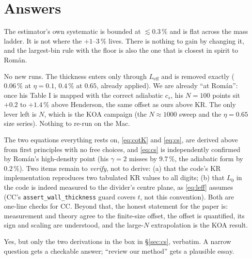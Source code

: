 \documentclass[11pt,a4paper]{article}
\newcommand{\Leff}{L_{\mathrm{eff}}}
\begin{document}
\section{Answers}
\label{sec:answers}
\begin{answer}
The estimator's own systematic is bounded at $\lesssim 0.3\,\%$ and is flat across the mass ladder. It is not where the $+1$--$3\,\%$ lives. There is nothing to gain by changing it, and the largest-bin rule with the floor is also the one that is closest in spirit to Rom\'an.
\end{answer}
\begin{answer}
No new runs. The thickness enters only through $\Leff$ and is removed exactly ($0.06\,\%$ at $\eta=0.1$, $0.4\,\%$ at $0.65$, already applied). We are already ``at Rom\'an'': once his Table I is mapped with the correct adiabatic $c_s$, his $N=100$ points sit $+0.2$ to $+1.4\,\%$ above Henderson, the same offset as ours above KR. The only lever left is $N$, which is the KOA campaign (the $N\approx1000$ sweep and the $\eta=0.65$ size series). Nothing to re-run on the Mac.
\end{answer}
\begin{answer}
The two equations everything rests on, \eqref{eq:cotK} and \eqref{eq:cs}, are derived above from first principles with no free choices, and \eqref{eq:cs} is independently confirmed by Rom\'an's high-density point (his $\gamma=2$ misses by $9.7\,\%$, the adiabatic form by $0.2\,\%$). Two items remain to \emph{verify}, not to derive: (a) that the code's KR implementation reproduces two tabulated KR values to all digits; (b) that $L_0$ in the code is indeed measured to the divider's centre plane, as \eqref{eq:leff} assumes (CC's \texttt{assert\_wall\_thickness} guard covers $t$, not this convention). Both are one-line checks for CC. Beyond that, the honest statement for the paper is: measurement and theory agree to the finite-size offset, the offset is quantified, its sign and scaling are understood, and the large-$N$ extrapolation is the KOA result.
\end{answer}
\begin{answer}
Yes, but only the two derivations in the box in \S\ref{sec:cs}, verbatim. A narrow question gets a checkable answer; ``review our method'' gets a plausible essay.
\end{answer}
\end{document}
